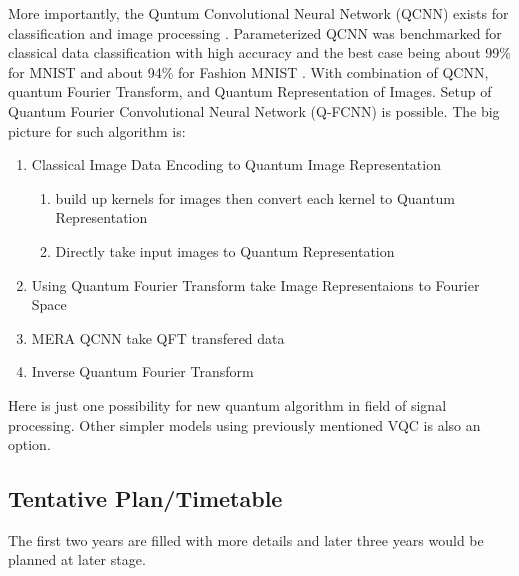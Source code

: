 \documentclass{article}
\begin{document}
More importantly, the Quntum Convolutional Neural Network (QCNN) exists for 
classification and image processing \cite{qml_cnn}. Parameterized 
QCNN was benchmarked for classical data classification with 
high accuracy and the best case being about 99\% for MNIST and 
about 94\% for Fashion MNIST \cite{qml_cnn1} \cite{qml_cnn2}. 
With combination of QCNN, quantum Fourier Transform, and Quantum 
Representation of Images. Setup of Quantum Fourier Convolutional Neural Network (Q-FCNN)
is possible. The big picture for such algorithm is:
\begin{enumerate}
  \item Classical Image Data Encoding to Quantum Image Representation
  \begin{enumerate}
    \item build up kernels for images then convert each kernel to Quantum Representation
    \item Directly take input images to Quantum Representation
  \end{enumerate}
  \item Using Quantum Fourier Transform take Image Representaions to Fourier Space
  \item MERA QCNN take QFT transfered data
  \item Inverse Quantum Fourier Transform
\end{enumerate}

Here is just one possibility for new quantum algorithm in field of signal processing. Other
simpler models using previously mentioned VQC is also an option. 

\subsection{Tentative Plan/Timetable}
The first two years are filled with more details 
and later three years would be planned at later stage. 
\end{document}
